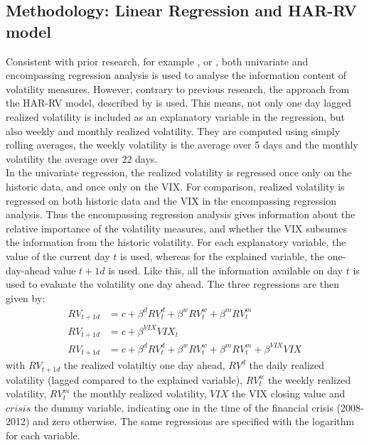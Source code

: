 \subsection{Methodology: Linear Regression and HAR-RV model}\label{sec:42Method}
Consistent with prior research, for example \textcite{jiang2003}, \textcite{canina1993} or \textcite{christensen1998}, both univariate and encompassing regression analysis is used to analyse the information content of volatility measures. However, contrary to previous research, the approach from the HAR-RV model, described by \textcite{Corsi2009} is used. This means, not only one day lagged realized volatility is included as an explanatory variable in the regression, but also weekly and monthly realized volatility. They are computed using simply rolling averages, the weekly volatility is the average over 5 days and the monthly volatility the average over 22 days.\\
In the univariate regression, the realized volatility is regressed once only on the historic data, and once only on the VIX. For comparison, realized volatility is regressed on both historic data and the VIX in the encompassing regression analysis. Thus the encompassing regression analysis gives information about the relative importance of the volatility measures, and whether the VIX subsumes the information from the historic volatility. For each explanatory variable, the value of the current day $t$ is used, whereas for the explained variable, the one-day-ahead value $t+1d$ is used. Like this, all the information available on day $t$ is used to evaluate the volatility one day ahead. The three regressions are then given by:
\begin{align}\label{eq:myregression}
RV_{t+1d} &= c + \beta^{d} RV^{d}_{t} + \beta^{w} RV^{w}_{t} + \beta^{m} RV^{m}_{t}  \\
RV_{t+1d} &= c + \beta^{VIX} VIX_{t} \\
RV_{t+1d} &= c + \beta^{d} RV^{d}_{t} + \beta^{w} RV^{w}_{t} + \beta^{m} RV^{m}_{t} + \beta^{VIX} VIX
\end{align}
with $RV_{t+1d}$ the realized volatiltiy one day ahead, $RV^{d}$ the daily realized volatility (lagged compared to the explained variable), $RV^{w}_{t}$ the weekly realized volatility, $RV^{m}_{t}$ the monthly realized volatility, $VIX$ the VIX closing value and $crisis$ the dummy variable, indicating one in the time of the financial crisis (2008-2012) and zero otherwise. The same regressions are specified with the logarithm for each variable.\\
